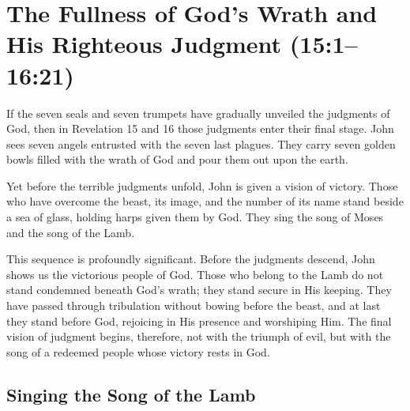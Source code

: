 \chapter{The Fullness of God's Wrath and His Righteous Judgment (15:1--16:21)}

If the seven seals and seven trumpets have gradually unveiled the judgments of God, then in Revelation 15 and 16 those judgments enter their final stage. John sees seven angels entrusted with the seven last plagues. They carry seven golden bowls filled with the wrath of God and pour them out upon the earth.

Yet before the terrible judgments unfold, John is given a vision of victory. Those who have overcome the beast, its image, and the number of its name stand beside a sea of glass, holding harps given them by God. They sing the song of Moses and the song of the Lamb.

This sequence is profoundly significant. Before the judgments descend, John shows us the victorious people of God. Those who belong to the Lamb do not stand condemned beneath God's wrath; they stand secure in His keeping. They have passed through tribulation without bowing before the beast, and at last they stand before God, rejoicing in His presence and worshiping Him. The final vision of judgment begins, therefore, not with the triumph of evil, but with the song of a redeemed people whose victory rests in God.

\section{Singing the Song of the Lamb}

